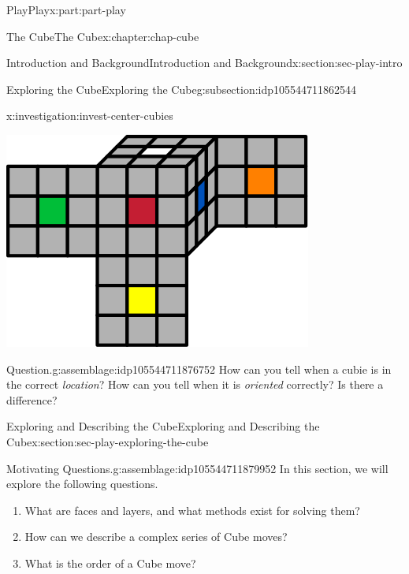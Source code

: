 \documentclass[oneside,10pt,]{book}
\numberwithin{equation}{section}
\begin{document}
\begin{partptx}{Play}{}{Play}{}{}{x:part:part-play}
\begin{chapterptx}{The Cube}{}{The Cube}{}{}{x:chapter:chap-cube}
\begin{sectionptx}{Introduction and Background}{}{Introduction and Background}{}{}{x:section:sec-play-intro}
\begin{subsectionptx}{Exploring the Cube}{}{Exploring the Cube}{}{}{g:subsection:idp105544711862544}
\begin{investigation}{}{x:investigation:invest-center-cubies}
\begin{image}{0.25}{0.5}{0.25}
\includegraphics[width=\linewidth]{./images/moving_cubies.svg}
\end{image}%
\end{investigation}%
\begin{assemblage}{Question.}{g:assemblage:idp105544711876752}%
How can you tell when a cubie is in the correct \emph{location}? How can you tell when it is \emph{oriented} correctly? Is there a difference?\footnotemark{}%
\end{assemblage}
%
\end{subsectionptx}
\end{sectionptx}
%
%
\typeout{************************************************}
\typeout{************************************************}
%
\begin{sectionptx}{Exploring and Describing the Cube}{}{Exploring and Describing the Cube}{}{}{x:section:sec-play-exploring-the-cube}
\begin{assemblage}{Motivating Questions.}{g:assemblage:idp105544711879952}%
In this section, we will explore the following questions. %
\begin{enumerate}
\item{}What are faces and layers, and what methods exist for solving them?%
\item{}How can we describe a complex series of Cube moves?%
\item{}What is the order of a Cube move?%
\end{enumerate}
%
\end{assemblage}
\begin{introduction}{}%

\end{introduction}
\end{sectionptx}
\end{chapterptx}
\end{partptx}
\end{document}
